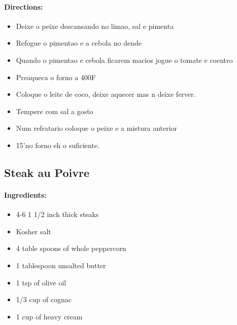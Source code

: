 \documentclass{article}
\begin{document}
\paragraph{Directions:}
\begin{itemize}
	\item Deixe o peixe descansando no limao, sal e pimenta
	\item Refogue o pimentao e a cebola no dende
	\item Quando o pimentao e cebola ficarem macios jogue o tomate e coentro
	\item Preaqueca o forno a 400F
	\item Coloque o leite de coco, deixe aquecer mas n deixe ferver. 
	\item Tempere com sal a gosto
	\item Num refratario coloque o peixe e a mistura anterior
	\item 15'no forno eh o suficiente.
\end{itemize} 

\subsection{Steak au Poivre}

\paragraph{Ingredients:}

\begin{itemize}
	\item 4-6 1 1/2 inch thick steaks
	\item Kosher salt
	\item 4 table spoons of whole peppercorn
	\item 1 tablespoon unsalted butter
	\item 1 tsp of olive oil
	\item 1/3 cup of cognac
	\item 1 cup of heavy cream
\end{itemize}
\end{document}
